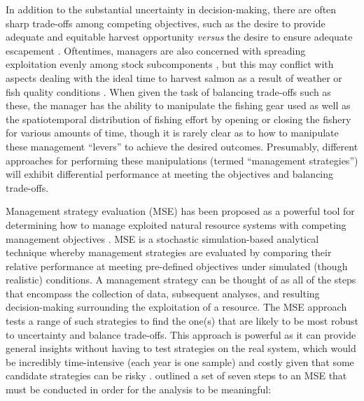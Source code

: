 \documentclass[12pt,]{book}
\theoremstyle{definition}
\theoremstyle{definition}
\theoremstyle{definition}
\theoremstyle{remark}
\begin{document}
In addition to the substantial uncertainty in decision-making, there are
often sharp trade-offs among competing objectives, such as the desire to
provide adequate and equitable harvest opportunity \emph{versus} the
desire to ensure adequate escapement \citep{catalano-jones-2014}.
Oftentimes, managers are also concerned with spreading exploitation
evenly among stock subcomponents \citep{schindler-etal-2010}, but this
may conflict with aspects dealing with the ideal time to harvest salmon
as a result of weather or fish quality conditions
\citep{adkison-cunningham-2015, carney-adkison-2014b}. When given the
task of balancing trade-offs such as these, the manager has the ability
to manipulate the fishing gear used as well as the spatiotemporal
distribution of fishing effort by opening or closing the fishery for
various amounts of time, though it is rarely clear as to how to
manipulate these management ``levers'' to achieve the desired outcomes.
Presumably, different approaches for performing these manipulations
(termed ``management strategies'') will exhibit differential performance
at meeting the objectives and balancing trade-offs.

Management strategy evaluation (MSE) has been proposed as a powerful
tool for determining how to manage exploited natural resource systems
with competing management objectives
\citep{butterworth-2007, cooke-1999}. MSE is a stochastic
simulation-based analytical technique whereby management strategies are
evaluated by comparing their relative performance at meeting pre-defined
objectives under simulated (though realistic) conditions. A management
strategy can be thought of as all of the steps that encompass the
collection of data, subsequent analyses, and resulting decision-making
surrounding the exploitation of a resource. The MSE approach tests a
range of such strategies to find the one(s) that are likely to be most
robust to uncertainty and balance trade-offs. This approach is powerful
as it can provide general insights without having to test strategies on
the real system, which would be incredibly time-intensive (each year is
one sample) and costly given that some candidate strategies can be risky
\citep{walters-martell-2004}. \citet{punt-etal-2014} outlined a set of
seven steps to an MSE that must be conducted in order for the analysis
to be meaningful:
\end{document}
